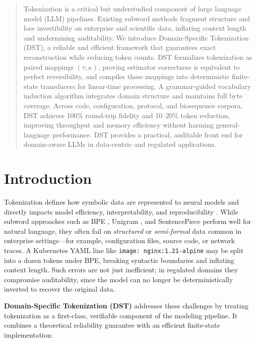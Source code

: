 \begin{abstract}
Tokenization is a critical but understudied component of large language model (LLM) pipelines.
Existing subword methods fragment structure and lose invertibility on enterprise and scientific data, inflating context length and undermining auditability.
We introduce Domain-Specific Tokenization (DST), a reliable and efficient framework that guarantees exact reconstruction while reducing token counts.
DST formalizes tokenization as paired mappings $(\tau,\kappa)$, proving estimator correctness is equivalent to perfect reversibility, and compiles these mappings into deterministic finite-state transducers for linear-time processing.
A grammar-guided vocabulary induction algorithm integrates domain structure and maintains full byte coverage.
Across code, configuration, protocol, and biosequence corpora, DST achieves 100\% round-trip fidelity and 10–20\% token reduction, improving throughput and memory efficiency without harming general-language performance.
DST provides a practical, auditable front end for domain-aware LLMs in data-centric and regulated applications.
\end{abstract}

\section{Introduction}
\label{sec:intro}

Tokenization defines how symbolic data are represented to neural models and directly impacts model efficiency, interpretability, and reproducibility \citep{Xue2022ByT5, Ding2023ByteLevelTradeoff}.
While subword approaches such as BPE \citep{Sennrich2016BPE}, Unigram \citep{Kudo2018Unigram}, and SentencePiece \citep{KudoRichardson2018SentencePiece} perform well for natural language, they often fail on \emph{structured} or \emph{semi-formal} data common in enterprise settings---for example, configuration files, source code, or network traces.
A Kubernetes YAML line like \texttt{image: nginx:1.21-alpine} may be split into a dozen tokens under BPE, breaking syntactic boundaries and inflating context length.
Such errors are not just inefficient; in regulated domains they compromise auditability, since the model can no longer be deterministically inverted to recover the original data.

\textbf{Domain-Specific Tokenization (DST)} addresses these challenges by treating tokenization as a first-class, verifiable component of the modeling pipeline.
It combines a theoretical reliability guarantee with an efficient finite-state implementation:

